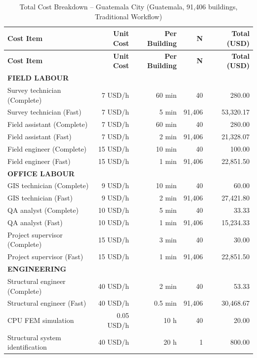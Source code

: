 \begin{longtable}{lrrrr}
\caption{Total Cost Breakdown – Guatemala City (Guatemala, 91,406 buildings, Traditional Workflow)} \\
\hline
\textbf{Cost Item} & \textbf{Unit Cost} & \textbf{Per Building} & \textbf{N} & \textbf{Total (USD)} \\
\hline
\endfirsthead

\hline
\textbf{Cost Item} & \textbf{Unit Cost} & \textbf{Per Building} & \textbf{N} & \textbf{Total (USD)} \\
\hline
\endhead

\multicolumn{5}{l}{\textbf{FIELD LABOUR}} \\

Survey technician (Complete) & 7 USD/h & 60 min & 40 & 280.00 \\
Survey technician (Fast) & 7 USD/h & 5 min & 91,406 & 53,320.17 \\
Field assistant (Complete) & 7 USD/h & 60 min & 40 & 280.00 \\
Field assistant (Fast) & 7 USD/h & 2 min & 91,406 & 21,328.07 \\
Field engineer (Complete) & 15 USD/h & 10 min & 40 & 100.00 \\
Field engineer (Fast) & 15 USD/h & 1 min & 91,406 & 22,851.50 \\
\hline

\multicolumn{5}{l}{\textbf{OFFICE LABOUR}} \\

GIS technician (Complete) & 9 USD/h & 10 min & 40 & 60.00 \\
GIS technician (Fast) & 9 USD/h & 2 min & 91,406 & 27,421.80 \\
QA analyst (Complete) & 10 USD/h & 5 min & 40 & 33.33 \\
QA analyst (Fast) & 10 USD/h & 1 min & 91,406 & 15,234.33 \\
Project supervisor (Complete) & 15 USD/h & 3 min & 40 & 30.00 \\
Project supervisor (Fast) & 15 USD/h & 1 min & 91,406 & 22,851.50 \\
\hline

\multicolumn{5}{l}{\textbf{ENGINEERING}} \\

Structural engineer (Complete) & 40 USD/h & 2 min & 40 & 53.33 \\
Structural engineer (Fast) & 40 USD/h & 0.5 min & 91,406 & 30,468.67 \\
CPU FEM simulation & 0.05 USD/h & 10 h & 40 & 20.00 \\
Structural system identification & 40 USD/h & 20 h & 1 & 800.00 \\
\hline


\end{longtable}
